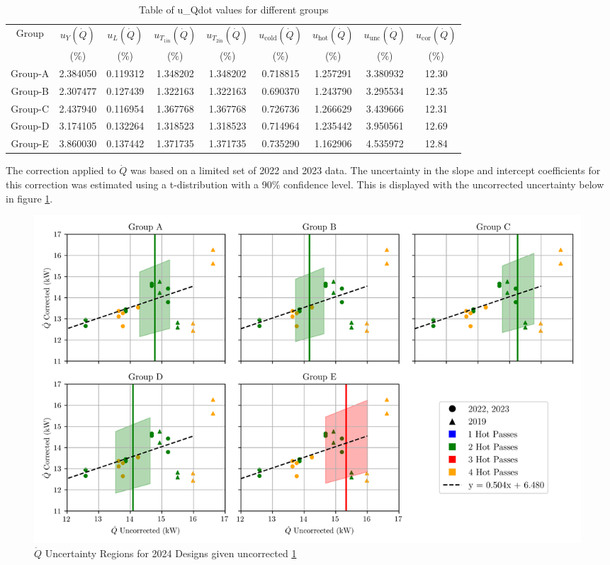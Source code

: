 \documentclass{article}
\begin{document}
\begin{table}[h!]
    \centering
    \begin{tabular}{c|c|c|c|c|c|c|c|c}

        Group & $u_Y(\dot{Q})$ & $u_L(\dot{Q})$ & $u_{T_\text{1in}}(\dot{Q})$ & $u_{T_\text{2in}}(\dot{Q})$ & $u_\text{cold}(\dot{Q})$ & $u_\text{hot}(\dot{Q})$ & $u_\text{unc}(\dot{Q})$ & $u_\text{cor}(\dot{Q})$\\
        & (\%) & (\%) & (\%) & (\%) & (\%) & (\%) & (\%) & (\%) \\
    \hline
    Group-A & 2.384050     & 0.119312      & 1.348202    & 1.348202    & 0.718815    & 1.257291   & 3.380932 & 12.30      \\
    Group-B & 2.307477     & 0.127439      & 1.322163    & 1.322163    & 0.690370    & 1.243790   & 3.295534 & 12.35    \\
    Group-C & 2.437940     & 0.116954      & 1.367768    & 1.367768    & 0.726736    & 1.266629   & 3.439666 & 12.31     \\
    Group-D & 3.174105     & 0.132264      & 1.318523    & 1.318523    & 0.714964    & 1.235442   & 3.950561 & 12.69     \\
    Group-E & 3.860030     & 0.137442      & 1.371735    & 1.371735    & 0.735290    & 1.162906   & 4.535972 & 12.84    \\
    \end{tabular}
    \caption{Table of u\_Qdot values for different groups}
    \label{tab:uncorrected_uncertainty}
\end{table}

The correction applied to $\dot{Q}$ was based on a limited set of 2022 and 2023 data.
The uncertainty in the slope and intercept coefficients for this correction was estimated using a t-distribution with a 90\% confidence level.
This is displayed with the uncorrected uncertainty below in figure \ref{fig:uncertainty_regions}.

\begin{figure}[H]
    \centering
    \includegraphics[width=0.99\textwidth]{Qdot_uncertainty_bands.png}
    \caption{$\dot{Q}$ Uncertainty Regions for 2024 Designs given uncorrected \ref{tab:uncorrected_uncertainty}}
    \label{fig:uncertainty_regions}
\end{figure}
\end{document}
